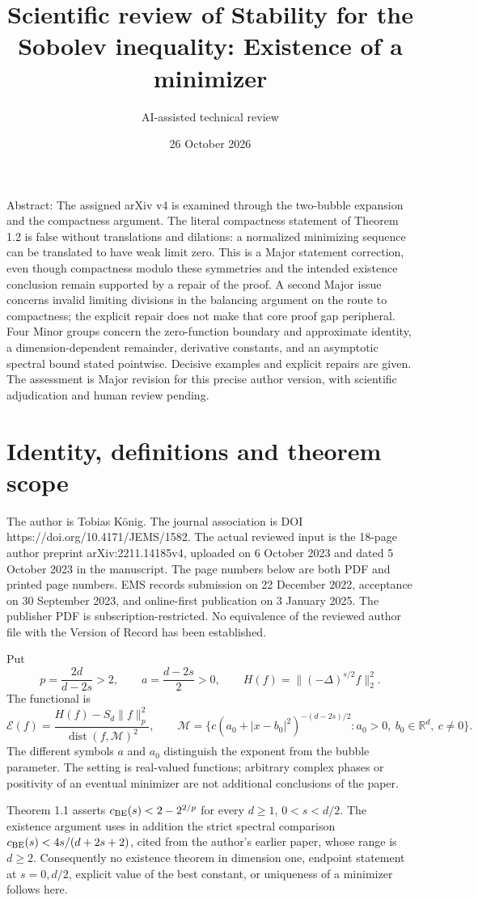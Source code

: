 \documentclass[10pt]{article}
\title{Scientific review of
Stability for the Sobolev inequality:
Existence of a minimizer}
\author{AI-assisted technical review}
\date{26 October 2026}
\begin{document}
\maketitle
Abstract: The assigned arXiv v4 is examined through the two-bubble expansion and the compactness argument. The literal compactness statement of Theorem 1.2 is false without translations and dilations: a normalized minimizing sequence can be translated to have weak limit zero. This is a Major statement correction, even though compactness modulo these symmetries and the intended existence conclusion remain supported by a repair of the proof. A second Major issue concerns invalid limiting divisions in the balancing argument on the route to compactness; the explicit repair does not make that core proof gap peripheral. Four Minor groups concern the zero-function boundary and approximate identity, a dimension-dependent remainder, derivative constants, and an asymptotic spectral bound stated pointwise. Decisive examples and explicit repairs are given. The assessment is Major revision for this precise author version, with scientific adjudication and human review pending.\par
\section*{Identity, definitions and theorem scope}
The author is Tobias König. The journal association is DOI https://doi.org/10.4171/JEMS/1582. The actual reviewed input is the 18-page author preprint arXiv:2211.14185v4, uploaded on 6 October 2023 and dated 5 October 2023 in the manuscript. The page numbers below are both PDF and printed page numbers. EMS records submission on 22 December 2022, acceptance on 30 September 2023, and online-first publication on 3 January 2025. The publisher PDF is subscription-restricted. No equivalence of the reviewed author file with the Version of Record has been established.\par
Put \[p=\frac{2d}{d-2s}>2,\qquad a=\frac{d-2s}{2}>0,\qquad
 H(f)=\|(-\Delta)^{s/2}f\|_2^2.\] The functional is \[\mathcal E(f)=\frac{H(f)-S_d\|f\|_p^2}{\operatorname{dist}(f,\mathcal M)^2},
 \qquad
 \mathcal M=\{c(a_0+|x-b_0|^2)^{-(d-2s)/2}:a_0>0,\ b_0\in\mathbb R^d,\ c\ne0\}.\] The different symbols \(a\) and \(a_0\) distinguish the exponent from the bubble parameter. The setting is real-valued functions; arbitrary complex phases or positivity of an eventual minimizer are not additional conclusions of the paper.\par
Theorem 1.1 asserts \(c_{\rm BE}(s)<2-2^{2/p}\) for every \(d\ge1\), \(0<s<d/2\). The existence argument uses in addition the strict spectral comparison \(c_{\rm BE}(s)<4s/(d+2s+2)\), cited from the author’s earlier paper, whose range is \(d\ge2\). Consequently no existence theorem in dimension one, endpoint statement at \(s=0,d/2\), explicit value of the best constant, or uniqueness of a minimizer follows here.\par
\end{document}
